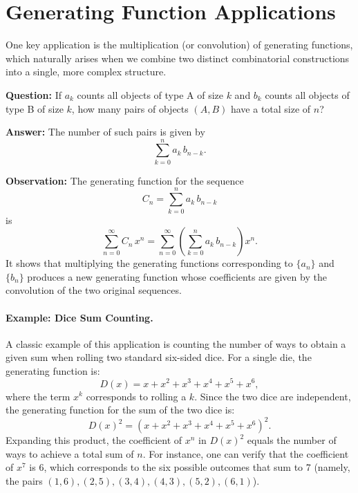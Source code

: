 \documentclass{article}
\begin{document}
\section{Generating Function Applications}

One key application is the multiplication (or convolution) of generating functions, which naturally arises when we combine two distinct combinatorial constructions into a single, more complex structure.

\textbf{Question:} If \(a_k\) counts all objects of type A of size \(k\) and \(b_k\) counts all objects of type B of size \(k\), how many pairs of objects \((A, B)\) have a total size of \(n\)?

\textbf{Answer:} The number of such pairs is given by
\[
\sum_{k=0}^{n} a_k\, b_{n-k}.
\]

\textbf{Observation:} The generating function for the sequence
\[
C_n = \sum_{k=0}^{n} a_k\, b_{n-k}
\]
is
\[
\sum_{n=0}^{\infty} C_n\, x^n = \sum_{n=0}^{\infty} \left(\sum_{k=0}^{n} a_k\, b_{n-k}\right)x^n.
\]
It shows that multiplying the generating functions corresponding to \( \{a_n\} \) and \( \{b_n\} \) produces a new generating function whose coefficients are given by the convolution of the two original sequences.


\paragraph{Example: Dice Sum Counting.}  
A classic example of this application is counting the number of ways to obtain a given sum when rolling two standard six-sided dice. For a single die, the generating function is:
\[
D(x) = x + x^2 + x^3 + x^4 + x^5 + x^6,
\]
where the term \(x^k\) corresponds to rolling a \(k\). Since the two dice are independent, the generating function for the sum of the two dice is:
\[
D(x)^2 = \left(x + x^2 + x^3 + x^4 + x^5 + x^6\right)^2.
\]
Expanding this product, the coefficient of \(x^n\) in \(D(x)^2\) equals the number of ways to achieve a total sum of \(n\). For instance, one can verify that the coefficient of \(x^7\) is 6, which corresponds to the six possible outcomes that sum to 7 (namely, the pairs \((1,6), (2,5), (3,4), (4,3), (5,2), (6,1)\)).
\end{document}
